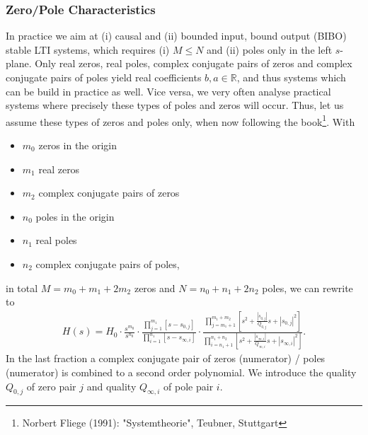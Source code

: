 \subsubsection{Zero/Pole Characteristics}
In practice we aim at (i) causal and (ii) bounded input, bound output (BIBO)
stable LTI systems, which requires (i) $M\leq N$ and (ii)
poles only in the left $s$-plane.
%
Only real zeros, real poles, complex conjugate pairs of zeros and
complex conjugate pairs of poles yield
real coefficients $b,a \in \mathbb{R}$, and thus systems which can be build in
practice as well.
%
Vice versa, we very often analyse practical systems where precisely these types
of poles and zeros will occur.
%
Thus, let us assume these types of zeros and poles only, when now following the
book\footnote{Norbert Fliege (1991): "Systemtheorie", Teubner, Stuttgart}.
%
With
\begin{itemize}
\item $m_0$ zeros in the origin
\item $m_1$ real zeros
\item $m_2$ complex conjugate pairs of zeros
\item $n_0$ poles in the origin
\item $n_1$ real poles
\item $n_2$ complex conjugate pairs of poles,
\end{itemize}
in total $M = m_0 + m_1 + 2 m_2$ zeros and $N = n_0 + n_1 + 2 n_2$ poles,
we can rewrite  to
\begin{align}
\label{eq:Hs_sorted_for_Bode}
H(s) = H_0
\cdot
\frac
{s^{m_0}}
{s^{n_0}}
\cdot
\frac
{\prod\limits_{j=1}^{m_1} [s-s_{0,j}]}
{\prod\limits_{i=1}^{n_1} [s-s_{\infty,i}]}
\cdot
\frac
{\prod\limits_{j=m_1+1}^{m_1+m_2} [s^2 + \frac{|s_{0,j}|}{Q_{0,j}} s + |s_{0,j}|^2]}
{\prod\limits_{i=n_1+1}^{n_1+n_2} [s^2 + \frac{|s_{\infty,i}|}{Q_{\infty,i}} s + |s_{\infty,i}|^2]}.
\end{align}
%
In the last fraction a complex conjugate pair of zeros (numerator)
/ poles (numerator) is combined to a second order polynomial.
We introduce the quality $Q_{0,j}$ of zero pair $j$ and
quality $Q_{\infty,i}$ of pole pair $i$.


